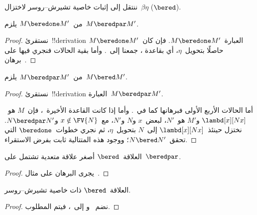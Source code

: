 \documentclass[../../../include/open-logic-section]{subfiles}
\begin{document}


ننتقل إلى إثبات خاصية تشيرش--روسر لاختزال~$\beta\eta$ ($\bered$).

\begin{lem}
  من~$M \beredone M'$ يلزم~$M \beredpar M'$.
\end{lem}

\begin{proof}
  نستقرئ~!!{derivation} العبارة~$M \beredone M'$.
  فإن كان~$M \beredone M'$ حاصلًا بتحويل~$\eta$، أي بقاعدة
  ، جمعنا
   إلى~.
  وأما بقية الحالات فنجري فيها على برهان~.
\end{proof}


\begin{lem}
  من~$M \beredpar M'$ يلزم~$M \bered M'$.
\end{lem}

\begin{proof}
  نستقرئ~!!{derivation} العبارة~$M \beredpar M'$.

  أما الحالات الأربع الأولى فبرهانها كما في~.
  وأما إذا كانت القاعدة الأخيرة~، فإن~$M$
  هو~$\lambd[x][Nx]$ و$M'$ هو~$N'$، لبعض~$x$ و$N$ و$N'$،
  مع~$x \notin \FV{N}$ و$N \beredpar N'$.
  نختزل حينئذ~$\lambd[x][Nx]$ إلى~$N$ بتحويل~$\eta$،
  ثم نجري خطوات~$\beredone$ التي تحقق~$N \bered N'$؛
  ووجود هذه المتتالية ثابت بفرض الاستقراء.
\end{proof}


\begin{lem}
  العلاقة~$\bered$ أصغر علاقة متعدية تشتمل على~$\beredpar$.
\end{lem}

\begin{proof}
  يجرى البرهان على مثال~.
\end{proof}

\begin{thm}
  العلاقة~$\bered$ ذات خاصية تشيرش--روسر.
\end{thm}

\begin{proof}
  نضم~ و إلى~، فيتم المطلوب.
\end{proof}
\end{document}
